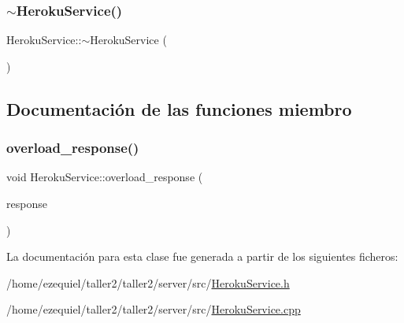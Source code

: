 \subsubsection{\texorpdfstring{$\sim$\+Heroku\+Service()}{~HerokuService()}}
{\footnotesize\ttfamily Heroku\+Service\+::$\sim$\+Heroku\+Service (\begin{DoxyParamCaption}{ }\end{DoxyParamCaption})}



\subsection{Documentación de las funciones miembro}
\mbox{\label{classHerokuService_a7b6c411527e3315759e96652953d0914}} 
\subsubsection{\texorpdfstring{overload\+\_\+response()}{overload\_response()}}
{\footnotesize\ttfamily void Heroku\+Service\+::overload\+\_\+response (\begin{DoxyParamCaption}\item[{Mongoose\+::\+Json\+Response \&}]{response }\end{DoxyParamCaption})}



La documentación para esta clase fue generada a partir de los siguientes ficheros\+:\begin{DoxyCompactItemize}
\item 
/home/ezequiel/taller2/taller2/server/src/\hyperlink{HerokuService_8h}{Heroku\+Service.\+h}\item 
/home/ezequiel/taller2/taller2/server/src/\hyperlink{HerokuService_8cpp}{Heroku\+Service.\+cpp}\end{DoxyCompactItemize}
